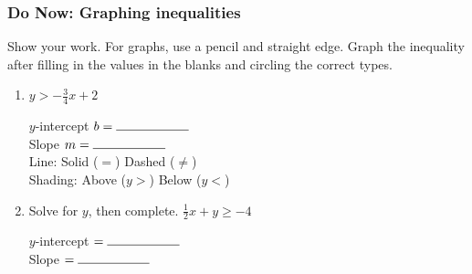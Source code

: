 \documentclass[12pt, twoside]{article}
\begin{document}
\subsubsection*{Do Now: Graphing inequalities}
Show your work. For graphs, {\large use a pencil and straight edge}. Graph the inequality after filling in the values in the blanks and circling the correct types.
  \begin{enumerate}

    \item $\displaystyle y > -\frac{3}{4} x +2 $

        \vspace{0.25cm}
        \begin{multicols}{2}
          $y$-intercept $b= \rule{2cm}{0.15mm}$ \\[0.5cm]
          Slope \hspace{0.7cm} $m= \rule{2cm}{0.15mm}$\\[0.5cm]

          Line: \hspace{1cm} Solid ($=$) \hspace{0.45cm} Dashed ($\neq$)\\[0.5cm]
          Shading: \hspace{0.3cm} Above ($y>$) \hspace{0.25cm} Below ($y<$)\\
        \end{multicols}

    \begin{center} %
    \end{center}

    \item Solve for $y$, then complete. $\displaystyle \frac{1}{2} x+ y \geq -4 $

        \vspace{3cm}
        \begin{multicols}{2}
          \raggedcolumns
          $y$-intercept $= \rule{2cm}{0.15mm}$ \\[0.5cm]
          Slope \hspace{0.7cm} $= \rule{2cm}{0.15mm}$\\


\end{multicols}
\end{enumerate}
\end{document}

